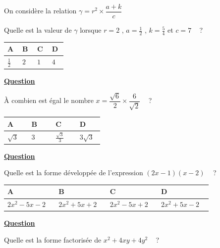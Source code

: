 \documentclass[oneside,12pt]{article}
\begin{document}
On considère la relation $\gamma=r^2\times\dfrac{a+k}{c}$

Quelle est la valeur de $\gamma$ lorsque $r=2$ , $a=\frac{1}{2}$ , $k=\frac{5}{4}$ et $c=7$ ~ ?

\begin{center}
	\renewcommand{\arraystretch}{1.5}
	\begin{tabular}{| P{0.22\linewidth} | P{0.22\linewidth} | P{0.22\linewidth} | P{0.22\linewidth} |} \hline
	A & B & C & D \\ \hline
	\rule{0pt}{5mm}
	$\frac{1}{2}$ & $2$ & $1$ & $4$ \\ \hline
	\end{tabular}
\end{center}



\underline{\textbf{Question }}

À combien est égal le nombre $x=\dfrac{\sqrt{6}}{2}\times\dfrac{6}{\sqrt{2}}$ ~ ?

\begin{center}
	\renewcommand{\arraystretch}{1.5}
	\begin{tabular}{| P{0.22\linewidth} | P{0.22\linewidth} | P{0.22\linewidth} | P{0.22\linewidth} |} \hline
	A & B & C & D \\ \hline
	\rule{0pt}{6.5mm}
	$\sqrt{3}$ & $3$ & $\frac{\sqrt{3}}{3}$ & $3\sqrt{3}$ \\[1pt] \hline
	\end{tabular}
\end{center}



\underline{\textbf{Question }}

Quelle est la forme développée de l'expression $(2x-1)(x-2)$ ~ ?

\begin{center}
	\renewcommand{\arraystretch}{1.5}
	\begin{tabular}{| P{0.22\linewidth} | P{0.22\linewidth} | P{0.22\linewidth} | P{0.22\linewidth} |} \hline
	A & B & C & D \\ \hline
	$2x^2-5x-2$ & $2x^2+5x+2$ & $2x^2-5x+2$ & $2x^2+5x-2$ \\[1pt] \hline
	\end{tabular}
\end{center}



\underline{\textbf{Question }}

Quelle est la forme factorisée de $x^2+4xy+4y^2$ ~ ?
\end{document}
